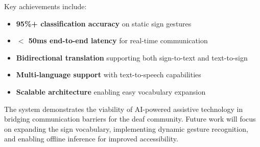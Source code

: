 \documentclass[conference]{IEEEtran}
\begin{document}
Key achievements include:
\begin{itemize}
    \item \textbf{95\%+ classification accuracy} on static sign gestures
    \item \textbf{$<$ 50ms end-to-end latency} for real-time communication
    \item \textbf{Bidirectional translation} supporting both sign-to-text and text-to-sign
    \item \textbf{Multi-language support} with text-to-speech capabilities
    \item \textbf{Scalable architecture} enabling easy vocabulary expansion
\end{itemize}

The system demonstrates the viability of AI-powered assistive technology in bridging communication barriers for the deaf community. Future work will focus on expanding the sign vocabulary, implementing dynamic gesture recognition, and enabling offline inference for improved accessibility.

\end{document}

